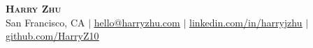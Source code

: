 \pagestyle{fancy}
\fancyhf{} %
\fancyfoot{}
\renewcommand{\headrulewidth}{0pt}
\renewcommand{\footrulewidth}{0pt}

\begin{center}
    \textbf{\Huge\scshape Harry Zhu} \\ \vspace{1pt}
    San Francisco, CA $|$ \href{mailto:hello@harryzhu.com}{\underline{hello@harryzhu.com}}
    $|$ \href{https://linkedin.com/in/harryjzhu}{\underline{linkedin.com/in/harryjzhu}}
    $|$ \href{https://github.com/HarryZ10}{\underline{github.com/HarryZ10}}
\end{center}

